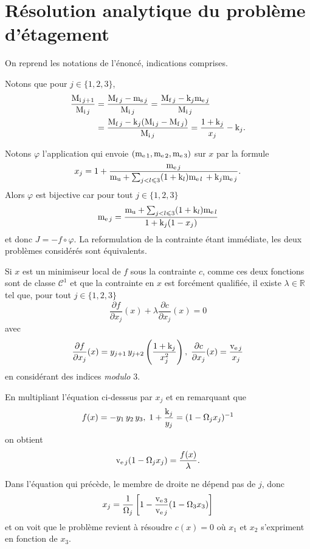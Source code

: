 \section{Résolution analytique du problème d'étagement}

On reprend les notations de l'énoncé, indications comprises.

\question Notons que pour $j\in\{1,2,3\}$,
\begin{align*}
\dfrac{\initmass{j+1}}{\initmass{j}} &= \dfrac{\finalmass{j}-\massstruct{j}}{\initmass{j}} =%
\dfrac{\finalmass{j}-\constructidx{j}\masspropel{j}}{\initmass{j}} \\ &= \dfrac{\finalmass{j}-\constructidx{j}(\initmass{j}-\finalmass{j})}{\initmass{j}} = \dfrac{1+\constructidx{j}}{x_{j}}-\constructidx{j}\text{.}
\end{align*}

Notons $\varphi$ l'application qui envoie $(\mathrm{m}_{\mathrm{e}\,1},\mathrm{m}_{\mathrm{e}\,2},\mathrm{m}_{\mathrm{e}\,3})$ sur $x$ par la formule
\[x_{j} = 1 + \dfrac{\mathrm{m}_{\mathrm{e}\,j}}{\mathrm{m}_{\mathrm{u}} + \sum_{j<l\leqslant 3}(1+\mathrm{k}_{l})\mathrm{m}_{\mathrm{e}\,l} \,+ \mathrm{k}_{j}\mathrm{m}_{\mathrm{e}\,j}}\text{.}\]
Alors $\varphi$ est bijective car pour tout $j\in\{1,2,3\}$
\[\mathrm{m}_{\mathrm{e}\,j}=\dfrac{\mathrm{m}_{\mathrm{u}} + \sum_{j<l\leqslant 3}(1+\mathrm{k}_{l})\mathrm{m}_{\mathrm{e}\,l}}{1+\mathrm{k}_{j}(1-x_{j})}\]
et donc $J=-f\circ \varphi$. La reformulation de la contrainte étant immédiate, les deux problèmes considérés sont équivalents.

\question Si $x$ est un minimiseur local de $f$ sous la contrainte $c$, comme ces deux fonctions sont de classe $\mathscr{C}^1$ et que la contrainte en $x$ est forcément qualifiée, il existe $\lambda\in\mathbb{R}$ tel que, pour tout $j\in\{1,2,3\}$
\[\dfrac{\partial f}{\partial x_{j}}(x) + \lambda\dfrac{\partial c}{\partial x_{j}}(x) = 0\]
avec
\[\dfrac{\partial f}{\partial x_{j}}(x) = y_{j+1}\,y_{j+2}\left(\dfrac{1+\constructidx{j}}{x_{j}^{2}}\right)%
,\; \dfrac{\partial c}{\partial x_{j}}(x) = \dfrac{\propellantsvlct{j}}{x_{j}}\]
en considérant des indices \emph{modulo} $3$.

En multipliant l'équation ci-desssus par $x_j$ et en remarquant que
\[f(x)=-y_{1}\,y_{2}\,y_{3},\; 1+\dfrac{\mathrm{k}_{j}}{y_{j}}=(1-\Omega_{j}x_{j})^{-1}\]
on obtient
\[\mathrm{v}_{\mathrm{e}\,j}(1-\Omega_{j}x_{j}) = \dfrac{f(x)}{\lambda}\text{.}\]

\question Dans l'équation qui précède, le membre de droite ne dépend pas de $j$, donc
\[x_{j} = \dfrac{1}{\Omega_{j}}\left[1-\dfrac{\mathrm{v}_{\mathrm{e}\,3}}{\mathrm{v}_{\mathrm{e}\,j}}(1-\Omega_{3}x_{3})\right]\]
et on voit que le problème revient à résoudre $c(x)=0$ où $x_1$ et $x_2$ s'expriment en fonction de $x_3$.


